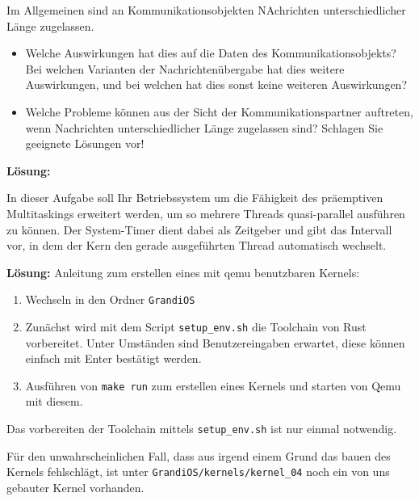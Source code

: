 

\begin{description}

Im Allgemeinen sind an Kommunikationsobjekten NAchrichten unterschiedlicher Länge zugelassen.
    \begin{itemize}
      \item Welche Auswirkungen hat dies auf die Daten des Kommunikationsobjekts? Bei welchen Varianten der Nachrichtenübergabe hat dies weitere Auswirkungen, und bei welchen hat dies sonst keine weiteren Auswirkungen?
      \item Welche Probleme können aus der Sicht der Kommunikationspartner auftreten, wenn Nachrichten unterschiedlicher Länge zugelassen sind? Schlagen Sie geeignete Lösungen vor!
    \end{itemize}

\textbf{Lösung:}


In  dieser  Aufgabe  soll  Ihr  Betriebssystem  um  die  Fähigkeit  des  präemptiven  Multitaskings erweitert  werden,  um  so  mehrere  Threads  quasi-parallel  ausführen  zu  können.  Der  System-Timer dient  dabei  als  Zeitgeber  und  gibt  das  Intervall  vor,  in  dem  der  Kern  den  gerade ausgeführten Thread automatisch wechselt. 

\textbf{Lösung:}
Anleitung zum erstellen eines mit qemu benutzbaren Kernels:
\begin{enumerate}
  \item Wechseln in den Ordner \texttt{GrandiOS}
  \item Zunächst wird mit dem Script \texttt{setup\_env.sh} die Toolchain von Rust vorbereitet. Unter Umständen sind Benutzereingaben erwartet, diese können einfach mit Enter bestätigt werden.
  \item Ausführen von \texttt{make run} zum erstellen eines Kernels und starten von Qemu mit diesem.
\end{enumerate}
Das vorbereiten der Toolchain mittels \texttt{setup\_env.sh} ist nur einmal notwendig.

Für den unwahrscheinlichen Fall, dass aus irgend einem Grund das bauen des Kernels fehlschlägt, ist unter {\texttt{GrandiOS/kernels/kernel\_04}} noch ein von uns gebauter Kernel vorhanden.


\end{description}
